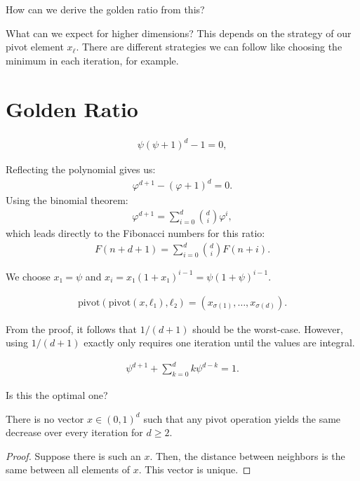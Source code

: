 \documentclass[english,version-2020-11]{uzl-thesis}
\begin{document}
How can we derive the golden ratio from this?

What can we expect for higher dimensions?
This depends on the strategy of our pivot element $x_\ell$.
There are different strategies we can follow like choosing the minimum in each iteration, for example.

\section{Golden Ratio}

\begin{align*}
  ψ(ψ + 1)^d - 1 = 0,
\end{align*}

Reflecting the polynomial gives us:
\begin{align*}
  φ^{d+1} - (φ + 1)^d = 0.
\end{align*}
Using the binomial theorem:
\begin{align*}
  φ^{d+1} = ∑_{i=0}^d \binom{d}{i} φ^i,
\end{align*}
which leads directly to the Fibonacci numbers for this ratio:
\begin{align*}
  F(n + d + 1) = ∑_{i=0}^d \binom{d}{i} F(n + i).
\end{align*}

We choose $x₁ = ψ$ and $x_i = x₁ (1 + x₁)^{i-1} = ψ (1 + ψ)^{i-1}$.

\begin{align*}
  \text{pivot}(\text{pivot}(x, ℓ₁), ℓ₂) = \left(x_{σ(1)}, \dots, x_{σ(d)}\right).
\end{align*}

From the proof, it follows that $1/(d+1)$ should be the worst-case.
However, using $1/(d+1)$ exactly only requires one iteration until the values are integral.

\begin{align*}
  ψ^{d+1} + ∑_{k=0}^d k ψ^{d-k} = 1.
\end{align*}

Is this the optimal one?

\begin{theorem}
  There is no vector $x ∈ (0, 1)^d$
  such that any pivot operation yields the same decrease
  over every iteration for $d ≥ 2$.
\end{theorem}

\begin{proof}
  Suppose there is such an $x$.
  Then, the distance between neighbors is the same between all elements of $x$.
  This vector is unique.
\end{proof}
\end{document}
